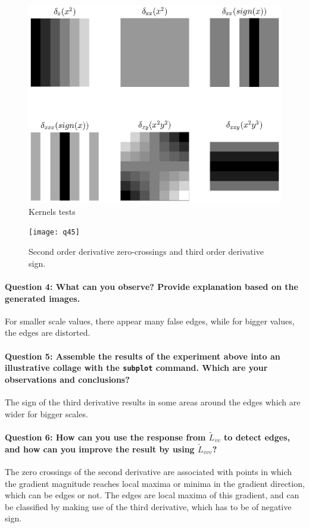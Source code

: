 \documentclass[12pt]{article}
\begin{document}
\begin{figure}[htbp]
 \centering
 \includegraphics[width=\textwidth]{q4prev}
 \caption{Kernels tests}
 \label{fig:q4prev}
\end{figure}

\begin{figure}[htbp]
 \centering
 \texttt{[image: q45]}
 \caption{Second order derivative zero-crossings and third order derivative sign.}
 \label{fig:q45}
\end{figure}

\paragraph{Question 4: What can you observe? Provide explanation based on the generated images.}
For smaller scale values, there appear many false edges, while for bigger values, the edges are distorted.

\paragraph{Question 5: Assemble the results of the experiment above into an illustrative collage
with the \texttt{subplot} command. Which are your observations and conclusions?}
The sign of the third derivative results in some areas around the edges which are wider for bigger scales.

\paragraph{Question 6: How can you use the response from \(\tilde{L}_{vv}\) to detect edges, and how can you improve the result by using \(\tilde{L}_{vvv}\)?}
The zero crossings of the second derivative are associated with points in which the gradient magnitude reaches local maxima or minima in the gradient direction, which can be edges or not. The edges are local maxima of this gradient, and can be classified by making use of the third derivative, which has to be of negative sign.
\end{document}

